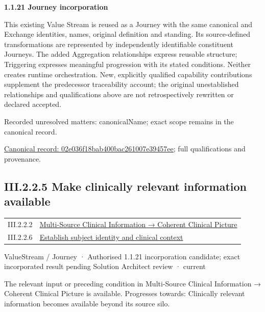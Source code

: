 \par\medskip\textbf{1.1.21 Journey incorporation}\par


This existing Value Stream is reused as a Journey with the same canonical and Exchange identities, names, original definition and standing. Its source-defined transformations are represented by independently identifiable constituent Journeys. The added Aggregation relationships express reusable structure; Triggering expresses meaningful progression with its stated conditions. Neither creates runtime orchestration. New, explicitly qualified capability contributions supplement the predecessor traceability account; the original unestablished relationships and qualifications above are not retrospectively rewritten or declared accepted.


{\small Recorded unresolved matters: canonicalName; exact scope remains in the canonical record.}\par
{\footnotesize \href{../../../../../../../continuum/strategy/value-stream/02e036f18bab400bac261007e39457ee.md}{Canonical record: 02e036f18bab400bac261007e39457ee}; full qualifications and provenance.}\par
\subsection*{III.2.2.5 Make clinically relevant information available}
\label{navigation:III.2.2.5}

\begin{longtable}{p{.22\linewidth}p{.73\linewidth}}
III.2.2.2 & \hyperref[element:01f655eae3d8485699449c3dcf4f9b56]{Multi-Source Clinical Information → Coherent Clinical Picture} \\
III.2.2.6 & \hyperref[element:667853f4a4c343dcb559584cb08d71cf]{Establish subject identity and clinical context} \\
\end{longtable}
\label{element:2e20e48451b64dafa4fe7eaee2501c7a}
{\small ValueStream / Journey · Authorised 1.1.21 incorporation candidate; exact incorporated result pending Solution Architect review · current}\par

The relevant input or preceding condition in Multi-Source Clinical Information → Coherent Clinical Picture is available. Progresses towards: Clinically relevant information becomes available beyond its source silo.



